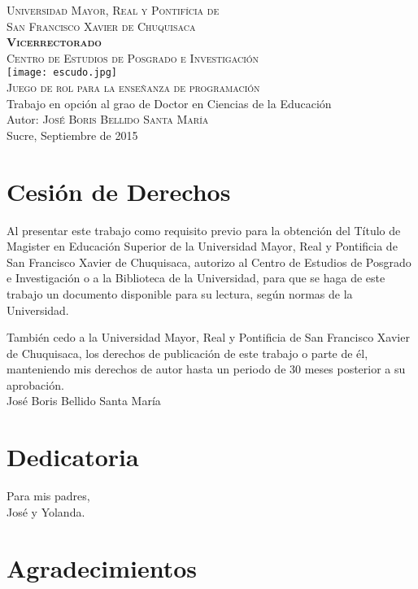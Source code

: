 \documentclass[12pt,letterpaper,titlepage,oneside]{book}
\begin{document}
\begin{titlepage}
\begin{center}
{\LARGE {\textsc{Universidad Mayor, Real y Pontifícia de \\ San Francisco Xavier de Chuquisaca}}} \\ [1.3cm]
{\Large \textsc \textbf{\textsc{Vicerrectorado}}} \\ [1.3cm]
{\Large \textsc{Centro de Estudios de Posgrado e Investigación}} \\ [1.3cm]
\texttt{[image: escudo.jpg]} \\ [1.3cm]
{\Large {\textsc{Juego de rol para la enseñanza de programación}}} \\[1.3cm]
 {Trabajo en opción al grao de Doctor en Ciencias de la Educación} \\[1.3cm]
{Autor: \textsc{José Boris Bellido Santa María}}\\[1.3cm]
Sucre, Septiembre de 2015
\end{center}
\end{titlepage}

\chapter*{Cesión de Derechos}
Al presentar este trabajo como requisito previo para la obtención del Título de Magister en
Educación Superior de la Universidad Mayor, Real y Pontificia de San Francisco Xavier de Chuquisaca, autorizo al Centro de Estudios de Posgrado e Investigación o a la Biblioteca de la Universidad, para que se haga de este trabajo un documento disponible para su lectura, según normas de la Universidad.

También cedo a la Universidad Mayor, Real y Pontificia de San Francisco Xavier de Chuquisaca, los derechos de publicación de este trabajo o parte de él, manteniendo mis derechos de autor hasta un periodo de 30 meses posterior a su aprobación.
\\[3cm]

\centering José Boris Bellido Santa María

\chapter*{Dedicatoria}
\centering Para mis padres, \\
José y Yolanda.

\chapter*{Agradecimientos}
\end{document}
